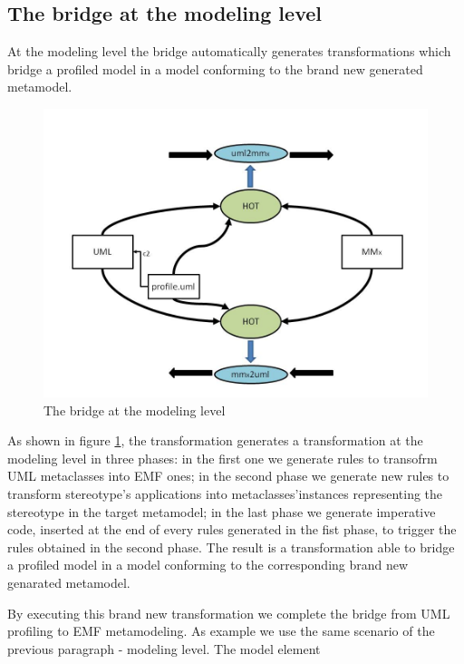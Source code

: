 \subsection{The bridge at the modeling level}\label{sec:modeLevel}


At the modeling level the bridge automatically generates transformations which bridge a profiled model in a model conforming to the brand new generated metamodel.
\begin{figure}[htbp]
	\centering
		\includegraphics[width=1.00\textwidth]{figures/Diapositiva3.JPG}
	\caption{The bridge at the modeling level}
	\label{fig:Diapositiva3}
\end{figure}
As shown in figure \ref{fig:Diapositiva3}, the transformation generates a transformation at the modeling level in three phases: in the first one we generate rules to transofrm UML metaclasses into EMF ones; in the second phase we generate new rules to transform stereotype’s applications into metaclasses’instances representing the stereotype in the target metamodel; in the last phase we generate imperative code, inserted at the end of every rules generated in the fist phase, to trigger the rules obtained in the second phase. The result is a transformation able to bridge a profiled model in a model conforming to the corresponding brand new genarated metamodel.

By executing this brand new transformation we complete the bridge from UML profiling to EMF metamodeling. As example we use the same scenario of the previous paragraph - modeling level. The model element 

